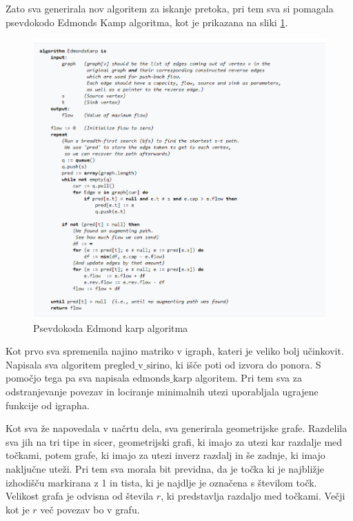 \documentclass[a4paper]{article}
\begin{document}
Zato sva generirala nov algoritem za iskanje pretoka, pri tem sva si pomagala psevdokodo Edmonds Kamp algoritma, kot je prikazana na sliki \ref{fig1}. 


\begin{figure}[h]
\centerline{\includegraphics[scale=.5]{edmondkarp.PNG}}
\caption{Psevdokoda Edmond karp algoritma}
\label{fig1}
\end{figure}

Kot prvo sva spremenila najino matriko v igraph, kateri je veliko bolj učinkovit. Napisala sva algoritem $\text{pregled\_v\_sirino}$, ki išče poti od izvora do ponora. S pomočjo tega pa sva napisala $\text{edmonds\_karp}$ algoritem. Pri tem sva za odstranjevanje povezav in lociranje minimalnih utezi uporabljala ugrajene funkcije od igrapha. 

Kot sva že napovedala v načrtu dela, sva generirala geometrijske grafe. Razdelila sva jih na tri tipe in sicer, geometrijski grafi, ki imajo za utezi kar razdalje med točkami, potem grafe, ki imajo za utezi inverz razdalj in še zadnje, ki imajo naključne uteži.  Pri tem sva morala bit previdna, da je točka ki je najbližje izhodišču markirana z 1 in tista, ki je najdlje je označena s številom točk. Velikost grafa je odvisna od števila $r$, ki predstavlja razdaljo med točkami. Večji kot je $r$ več povezav bo v grafu. 
\end{document}
